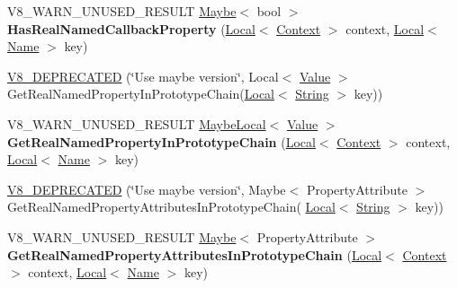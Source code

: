 \begin{DoxyCompactItemize}
\item 
V8\+\_\+\+W\+A\+R\+N\+\_\+\+U\+N\+U\+S\+E\+D\+\_\+\+R\+E\+S\+U\+LT \hyperlink{classv8_1_1_maybe}{Maybe}$<$ bool $>$ {\bfseries Has\+Real\+Named\+Callback\+Property} (\hyperlink{classv8_1_1_local}{Local}$<$ \hyperlink{classv8_1_1_context}{Context} $>$ context, \hyperlink{classv8_1_1_local}{Local}$<$ \hyperlink{classv8_1_1_name}{Name} $>$ key)\hypertarget{classv8_1_1_object_a97809eef1662ad04dcdac35344c5a05d}{}\label{classv8_1_1_object_a97809eef1662ad04dcdac35344c5a05d}

\item 
\hyperlink{classv8_1_1_object_a00982b58e0c86fcb37f5d74c8a33d1b8}{V8\+\_\+\+D\+E\+P\+R\+E\+C\+A\+T\+ED} (\char`\"{}Use maybe version\char`\"{}, Local$<$ \hyperlink{classv8_1_1_value}{Value} $>$ Get\+Real\+Named\+Property\+In\+Prototype\+Chain(\hyperlink{classv8_1_1_local}{Local}$<$ \hyperlink{classv8_1_1_string}{String} $>$ key))
\item 
V8\+\_\+\+W\+A\+R\+N\+\_\+\+U\+N\+U\+S\+E\+D\+\_\+\+R\+E\+S\+U\+LT \hyperlink{classv8_1_1_maybe_local}{Maybe\+Local}$<$ \hyperlink{classv8_1_1_value}{Value} $>$ {\bfseries Get\+Real\+Named\+Property\+In\+Prototype\+Chain} (\hyperlink{classv8_1_1_local}{Local}$<$ \hyperlink{classv8_1_1_context}{Context} $>$ context, \hyperlink{classv8_1_1_local}{Local}$<$ \hyperlink{classv8_1_1_name}{Name} $>$ key)\hypertarget{classv8_1_1_object_aca4441ef8fd09bc809ba296d6ebed3ed}{}\label{classv8_1_1_object_aca4441ef8fd09bc809ba296d6ebed3ed}

\item 
\hyperlink{classv8_1_1_object_ad227cb56752461c88badb0924132cfbc}{V8\+\_\+\+D\+E\+P\+R\+E\+C\+A\+T\+ED} (\char`\"{}Use maybe version\char`\"{}, Maybe$<$ Property\+Attribute $>$ Get\+Real\+Named\+Property\+Attributes\+In\+Prototype\+Chain(                               \hyperlink{classv8_1_1_local}{Local}$<$ \hyperlink{classv8_1_1_string}{String} $>$ key))
\item 
V8\+\_\+\+W\+A\+R\+N\+\_\+\+U\+N\+U\+S\+E\+D\+\_\+\+R\+E\+S\+U\+LT \hyperlink{classv8_1_1_maybe}{Maybe}$<$ Property\+Attribute $>$ {\bfseries Get\+Real\+Named\+Property\+Attributes\+In\+Prototype\+Chain} (\hyperlink{classv8_1_1_local}{Local}$<$ \hyperlink{classv8_1_1_context}{Context} $>$ context, \hyperlink{classv8_1_1_local}{Local}$<$ \hyperlink{classv8_1_1_name}{Name} $>$ key)\hypertarget{classv8_1_1_object_a06a7dd82554ee4e82a6c54f7fff6b4bd}{}\label{classv8_1_1_object_a06a7dd82554ee4e82a6c54f7fff6b4bd}


\end{DoxyCompactItemize}
